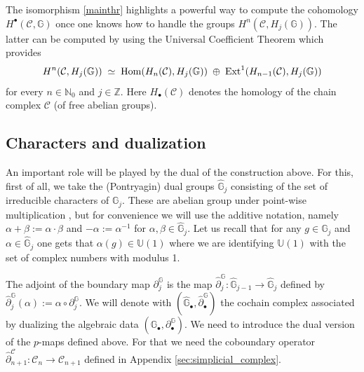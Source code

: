 \documentclass[a4paper,12pt,twoside,reqno]{amsart}
\theoremstyle{plain}
\theoremstyle{definition}
\theoremstyle{remark}
\numberwithin{equation}{section}
\numberwithin{figure}{section}
\numberwithin{table}{section}
\newcommand{\f}[1]{\mathcal{#1}}
\newcommand{\n}[1]{\mathbb{#1}}
\begin{document}
	
	
	
	
	
	\medskip
	
	
	
	
	
	
	
	The isomorphism \eqref{mainthr}  highlights a powerful way to compute the cohomology $H^\bullet(\f{C},\n{G})$ once one knows how to handle the groups $H^n(\f{C}, H_{j}(\n{G}))$. The latter can be computed by using the 
	Universal Coefficient Theorem \cite[Theorem 3.2]{Hatcher} which provides
	\begin{equation}\label{UCT}
		H^n(\f{C}, H_{j}(\n{G}))\;\simeq\;{\rm Hom}(H_n(\f{C}),H_j(\n{G}))\;\oplus\; {\rm Ext}^1(H_{n-1}(\f{C}),H_j(\n{G}))
	\end{equation}
	for every $n\in\n{N}_0$ and $j\in\n{Z}$. Here $H_\bullet(\f{C})$
	denotes the homology of the chain complex $\f{C}$ (of free abelian groups).
	
	
	
	
	
	
	
	
	
	\subsection{Characters and dualization}
	An important role will be played by the dual of the construction above. For this, first of all, we take the (Pontryagin) dual groups  $\widehat{\n{G}}_j$ consisting of the set of irreducible characters of $\n{G}_j$. These are abelian group under point-wise multiplication \cite[Exercise 2.7]{issacs}, but for convenience we will use the additive notation, namely $\alpha+\beta:=\alpha\cdot \beta$ and $-\alpha:=\alpha^{-1}$ for $\alpha,\beta\in \widehat{\n{G}}_j$.
	Let us recall that for any $g\in\n{G}_j$ and $\alpha\in \widehat{\n{G}}_j$ one gets that $\alpha(g)\in\n{U}(1)$ where we are identifying 
	$\n{U}(1)$ with the set of complex numbers with modulus 1. 
	
	
	
	
	
	
	
	\medskip
	
	
	
	
	
	
	
	
	The adjoint of the  boundary map $\partial_{j}^\n{G}$ is the map  $\widehat{\partial}_{j}^\n{G}:\widehat{\n{G}}_{j-1}\to\widehat{\n{G}}_{j}$ defined by $\widehat{\partial}_{j}^\n{G}(\alpha):=\alpha\circ \partial_{j}^\n{G}$. We will denote with $(\widehat{\n{G}}_\bullet ,\widehat{\partial}_\bullet ^\n{G})$ the cochain complex associated by dualizing   the algebraic data
	$(\n{G}_\bullet ,\partial_\bullet ^\n{G})$. We need to introduce the dual version of the 
	$p$-maps defined above. For that we need the  coboundary operator $\widehat{\partial}^\f{C}_{n+1}:\f{C}_n\to \f{C}_{n+1}$ defined in Appendix \ref{sec:simplicial_complex}.
	
\end{document}
